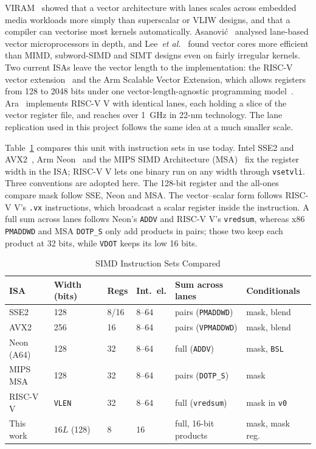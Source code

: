 VIRAM~\cite{viram} showed that a vector architecture with lanes scales across embedded
media workloads more simply than superscalar or VLIW designs, and that a compiler can
vectorise most kernels automatically. Asanovi\'c~\cite{asanovic98} analysed lane-based
vector microprocessors in depth, and Lee~\emph{et al.}~\cite{maven} found vector cores
more efficient than MIMD, subword-SIMD and SIMT designs even on fairly irregular
kernels. Two current ISAs leave the vector length to the implementation: the RISC-V
vector extension~\cite{rvv} and the Arm Scalable Vector Extension, which allows
registers from 128 to 2048 bits under one vector-length-agnostic programming
model~\cite{sve}. Ara~\cite{ara} implements RISC-V V with identical lanes, each holding
a slice of the vector register file, and reaches over 1~GHz in 22-nm technology. The
lane replication used in this project follows the same idea at a much smaller scale.

Table~\ref{tab:isas} compares this unit with instruction sets in use today. Intel SSE2
and AVX2~\cite{intelsdm}, Arm Neon~\cite{armarm} and the MIPS SIMD Architecture
(MSA)~\cite{msa} fix the register width in the ISA; RISC-V V lets one binary run on any
width through \texttt{vsetvli}. Three conventions are adopted here. The 128-bit
register and the all-ones compare mask follow SSE, Neon and MSA. The vector--scalar form
follows RISC-V V's \texttt{.vx} instructions, which broadcast a scalar register inside
the instruction. A full sum across lanes follows Neon's \texttt{ADDV} and RISC-V V's
\texttt{vredsum}, whereas x86 \texttt{PMADDWD} and MSA \texttt{DOTP\_S} only add
products in pairs; those two keep each product at 32 bits, while \texttt{VDOT} keeps its
low 16 bits.

\begin{table}[t]
\centering
\caption{SIMD Instruction Sets Compared}
\label{tab:isas}
\scriptsize
\setlength{\tabcolsep}{2.6pt}
\begin{tabular}{llllll}
\toprule
ISA & Width (bits) & Regs & Int.\ el. & Sum across lanes & Conditionals \\
\midrule
SSE2       & 128           & 8/16 & 8--64 & pairs (\texttt{PMADDWD})  & mask, blend \\
AVX2       & 256           & 16   & 8--64 & pairs (\texttt{VPMADDWD}) & mask, blend \\
Neon (A64) & 128           & 32   & 8--64 & full (\texttt{ADDV})      & mask, \texttt{BSL} \\
MIPS MSA   & 128           & 32   & 8--64 & pairs (\texttt{DOTP\_S})  & mask \\
RISC-V V   & \texttt{VLEN} & 32   & 8--64 & full (\texttt{vredsum})   & mask in \texttt{v0} \\
This work  & $16L$ (128)   & 8    & 16    & full, 16-bit products     & mask, mask reg.\ \\
\bottomrule
\end{tabular}
\end{table}

